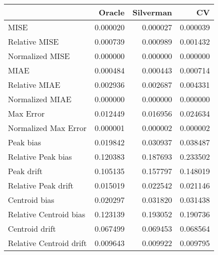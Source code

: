 \begin{tabular}{lrrr}
  \hline
 & Oracle & Silverman & CV \\ 
  \hline
MISE & 0.000020 & 0.000027 & 0.000039 \\ 
  Relative MISE & 0.000739 & 0.000989 & 0.001432 \\ 
  Normalized MISE & 0.000000 & 0.000000 & 0.000000 \\ 
  MIAE & 0.000484 & 0.000443 & 0.000714 \\ 
  Relative MIAE & 0.002936 & 0.002687 & 0.004331 \\ 
  Normalized MIAE & 0.000000 & 0.000000 & 0.000000 \\ 
  Max Error & 0.012449 & 0.016956 & 0.024634 \\ 
  Normalized Max Error & 0.000001 & 0.000002 & 0.000002 \\ 
  Peak bias & 0.019842 & 0.030937 & 0.038487 \\ 
  Relative Peak bias & 0.120383 & 0.187693 & 0.233502 \\ 
  Peak drift & 0.105135 & 0.157797 & 0.148019 \\ 
  Relative Peak drift & 0.015019 & 0.022542 & 0.021146 \\ 
  Centroid bias & 0.020297 & 0.031820 & 0.031438 \\ 
  Relative Centroid bias & 0.123139 & 0.193052 & 0.190736 \\ 
  Centroid drift & 0.067499 & 0.069453 & 0.068564 \\ 
  Relative Centroid drift & 0.009643 & 0.009922 & 0.009795 \\ 
   \hline
\end{tabular}
